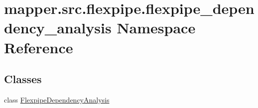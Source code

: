 \hypertarget{namespacemapper_1_1src_1_1flexpipe_1_1flexpipe__dependency__analysis}{}\section{mapper.\+src.\+flexpipe.\+flexpipe\+\_\+dependency\+\_\+analysis Namespace Reference}
\label{namespacemapper_1_1src_1_1flexpipe_1_1flexpipe__dependency__analysis}
\subsection*{Classes}
\begin{DoxyCompactItemize}
\item 
class \hyperlink{classmapper_1_1src_1_1flexpipe_1_1flexpipe__dependency__analysis_1_1_flexpipe_dependency_analysis}{Flexpipe\+Dependency\+Analysis}
\end{DoxyCompactItemize}

